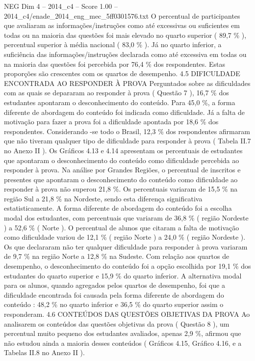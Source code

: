 \begin{textsample}{NEG Dim 4 – 2014\_c4 – Score 1.00 – 2014\_c4/enade\_2014\_eng\_mec\_5ff0301576.txt}
O percentual de participantes que avaliaram as informações/instruções como até excessivas ou suficientes em todas ou na maioria das questões foi mais elevado no quarto superior ( 89,7 \% ), percentual superior à média nacional ( 83,0 \% ).
Já no quarto inferior, a suficiência das informações/instruções declarada como até excessiva em todas ou na maioria das questões foi percebida por 76,4 \% dos respondentes.
Estas proporções são crescentes com os quartos de desempenho. 4.5 DIFICULDADE ENCONTRADA AO RESPONDER À PROVA Perguntados sobre as dificuldades com as quais se depararam ao responder à prova ( Questão 7 ), 16,7 \% dos estudantes apontaram o desconhecimento do conteúdo.
Para 45,0 \%, a forma diferente de abordagem do conteúdo foi indicada como dificuldade.
Já a falta de motivação para fazer a prova foi a dificuldade apontada por 18,6 \% dos respondentes.
Considerando -se todo o Brasil, 12,3 \% dos respondentes afirmaram que não tiveram qualquer tipo de dificuldade para responder à prova ( Tabela II.7 no Anexo II ).
Os Gráficos 4.13 e 4.14 apresentam os percentuais de estudantes que apontaram o desconhecimento do conteúdo como dificuldade percebida ao responder à prova.
Na análise por Grandes Regiões, o percentual de inscritos e presentes que apontaram o desconhecimento do conteúdo como dificuldade ao responder à prova não superou 21,8 \%.
Os percentuais variaram de 15,5 \% na região Sul a 21,8 \% na Nordeste, sendo esta diferença significativa estatisticamente.
A forma diferente de abordagem do conteúdo foi a escolha modal dos estudantes, com percentuais que variaram de 36,8 \% ( região Nordeste ) a 52,6 \% ( Norte ).
O percentual de alunos que citaram a falta de motivação como dificuldade variou de 12,1 \% ( região Norte ) a 24,0 \% ( região Nordeste ).
Os que declararam não ter qualquer dificuldade para responder à prova variaram de 9,7 \% na região Norte a 12,8 \% na Sudeste.
Com relação aos quartos de desempenho, o desconhecimento do conteúdo foi a opção escolhida por 19,1 \% dos estudantes do quarto superior e 15,9 \% do quarto inferior.
A alternativa modal para os alunos, quando agregados pelos quartos de desempenho, foi que a dificuldade encontrada foi causada pela forma diferente de abordagem do conteúdo : 48,2 \% no quarto inferior e 36,5 \% do quarto superior assim o responderam. 4.6 CONTEÚDOS DAS QUESTÕES OBJETIVAS DA PROVA Ao analisarem os conteúdos das questões objetivas da prova ( Questão 8 ), um percentual muito pequeno dos estudantes avaliados, apenas 2,9 \%, afirmou que não estudou ainda a maioria desses conteúdos ( Gráficos 4.15, Gráfico 4.16, e a Tabelas II.8 no Anexo II ).

\end{textsample}
